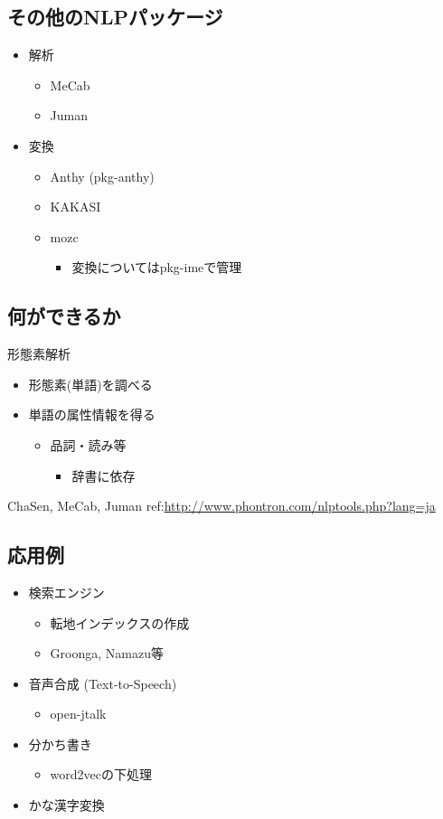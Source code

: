 \documentclass[mingoth,a4paper]{jsarticle}
\begin{document}
\subsection{その他のNLPパッケージ}
\begin{itemize}
\item 解析
  \begin{itemize}
  \item MeCab
  \item Juman
  \end{itemize}
\item 変換
  \begin{itemize}
  \item Anthy (pkg-anthy)
  \item KAKASI
  \item mozc
    \begin{itemize}
    \item 変換についてはpkg-imeで管理
    \end{itemize}
  \end{itemize}
\end{itemize}

\subsection{何ができるか}
形態素解析
\begin{itemize}
\item 形態素(単語)を調べる
\item 単語の属性情報を得る
  \begin{itemize}
  \item 品詞・読み等
    \begin{itemize}
    \item 辞書に依存
    \end{itemize}
  \end{itemize}    
\end{itemize}

 ChaSen, MeCab, Juman
 ref:\url{http://www.phontron.com/nlptools.php?lang=ja}

\subsection{応用例}
\begin{itemize}
\item 検索エンジン
  \begin{itemize}
  \item 転地インデックスの作成
  \item Groonga, Namazu等
  \end{itemize}
\item 音声合成 (Text-to-Speech)
  \begin{itemize}
  \item open-jtalk
  \end{itemize}
\item 分かち書き
  \begin{itemize}
  \item word2vecの下処理
  \end{itemize}
\item かな漢字変換
\end{itemize}
\end{document}
